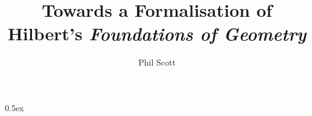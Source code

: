 \documentclass[phd,cisa]{infthesis}
\title{Towards a Formalisation of Hilbert's \emph{Foundations of Geometry}}
\author{Phil Scott}
\begin{document}
\begin{preliminary}

\maketitle


\standarddeclaration

\tableofcontents

\end{preliminary}

\parindent 0pt\parskip 0.5ex























\appendix




\end{document}
